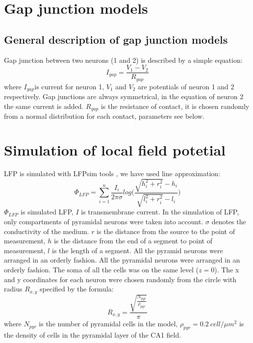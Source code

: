 \documentclass[a4paper,12pt]{article}
\begin{document}
\section{Gap junction models} \label{gap_junctions_models}
\subsection{General description of gap junction models}
Gap junction between two neurons (1 and 2) is described by a simple equation:
\begin{equation}
I_{gap} = \frac{V_{1} - V_{2}}{R_{gap}}
\end{equation}
where $I_{gap}$is current for neuron 1, $V_{1}$ and $V_{2}$ are potentials of neuron 1 and 2 respectively. Gap junctions are always symmetrical, in the equation of neuron 2 the same current is added. $R_{gap}$ is the resistance of contact, it is chosen randomly from a normal distribution for each contact, parameters see below.





\section{Simulation of local field potetial} \label{field_potetial_model}
LFP is simulated with LFPsim tools \cite{parasuram_computational_2016}, we have used line approximation:
\begin{equation} 
\Phi_{LFP} = \sum^{n}_{i=1}{ \frac{I_i}{2\pi \sigma}log \Big(\frac{\sqrt{h_i^2 + r_i^2}-h_i}{\sqrt{l_i^2 + r_i^2}-l_i} } \Big)
\end{equation}
$\Phi_{LFP}$ is simulated LFP, $I$ is transmembrane current. In the simulation of LFP, only compartments of pyramidal neurons were taken into account. $\sigma$ denotes the conductivity of the medium. $r$ is the distance from the source to the point of measurement, $h$  is the distance from the end of a segment to point of measurement, $l$ is the length of a segment. All the pyramid neurons were arranged in an orderly fashion. All the pyramidal neurons were arranged in an
orderly fashion. The soma of all the cells was on the same level ($z = 0$). The x and y coordinates for each neuron were chosen randomly from the circle with radius $R_{x, y}$ specified by the formula:
\begin{equation} 
R_{x, y} = \frac{\sqrt{\frac{N_{pyr}}{\rho_{pyr}} }} {\pi}
\end{equation}
where $N_{pyr}$ is the number of pyramidal cells in the model, $\rho_{pyr} = 0.2 \ cell/\mu m^2$ is the density of cells in the pyramidal layer of the CA1 field.



\end{document}
